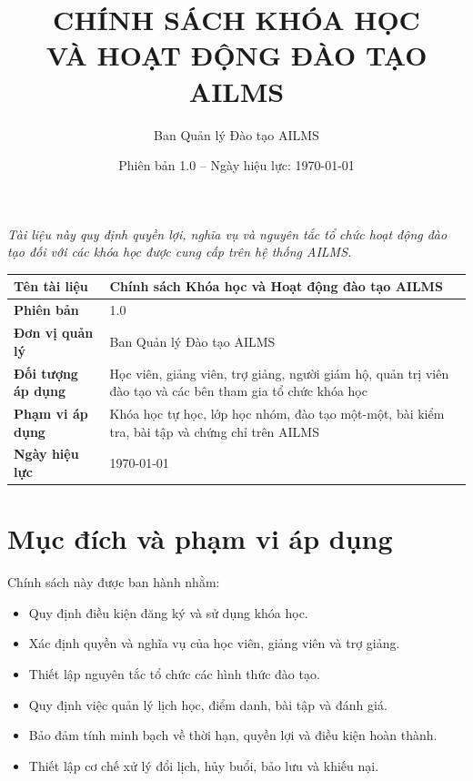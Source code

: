 \documentclass[12pt,a4paper]{article}
\title{
    \textbf{\LARGE CHÍNH SÁCH KHÓA HỌC\\
    VÀ HOẠT ĐỘNG ĐÀO TẠO AILMS}
}
\author{Ban Quản lý Đào tạo AILMS}
\date{Phiên bản 1.0 -- Ngày hiệu lực: \today}
\begin{document}
\maketitle

\begin{center}
    \textit{Tài liệu này quy định quyền lợi, nghĩa vụ và nguyên tắc tổ chức
    hoạt động đào tạo đối với các khóa học được cung cấp trên hệ thống AILMS.}
\end{center}

\vspace{0.8cm}

\begin{longtable}{|>{\bfseries}p{4cm}|p{9.5cm}|}
    \hline
    Tên tài liệu &
    Chính sách Khóa học và Hoạt động đào tạo AILMS \\
    \hline
    Phiên bản & 1.0 \\
    \hline
    Đơn vị quản lý & Ban Quản lý Đào tạo AILMS \\
    \hline
    Đối tượng áp dụng &
    Học viên, giảng viên, trợ giảng, người giám hộ,
    quản trị viên đào tạo và các bên tham gia tổ chức khóa học \\
    \hline
    Phạm vi áp dụng &
    Khóa học tự học, lớp học nhóm, đào tạo một-một,
    bài kiểm tra, bài tập và chứng chỉ trên AILMS \\
    \hline
    Ngày hiệu lực & \today \\
    \hline
\end{longtable}

\tableofcontents
\newpage

\section{Mục đích và phạm vi áp dụng}

Chính sách này được ban hành nhằm:

\begin{itemize}
    \item Quy định điều kiện đăng ký và sử dụng khóa học.
    \item Xác định quyền và nghĩa vụ của học viên, giảng viên và trợ giảng.
    \item Thiết lập nguyên tắc tổ chức các hình thức đào tạo.
    \item Quy định việc quản lý lịch học, điểm danh, bài tập và đánh giá.
    \item Bảo đảm tính minh bạch về thời hạn, quyền lợi và điều kiện hoàn thành.
    \item Thiết lập cơ chế xử lý đổi lịch, hủy buổi, bảo lưu và khiếu nại.
\end{itemize}
\end{document}
